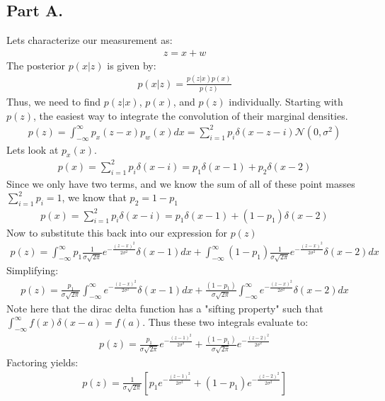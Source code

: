 \documentclass{article}
\begin{document}
\subsection*{Part A.}
Lets characterize our measurement as:
\begin{align*}
z = x + w
\end{align*}
The posterior $p(x|z)$ is given by:
\begin{align*}
p(x|z) = \frac{p(z|x) p(x)}{p(z)}
\end{align*}
Thus, we need to find $p(z|x)$, $p(x)$, and $p(z)$ individually. Starting with $p(z)$, the easiest way to integrate the convolution of their marginal densities.
\begin{align*}
p(z) = \int_{-\infty}^{\infty} p_x(z-x)p_w(x)dx = \sum_{i=1}^{2} p_i \delta(x-z-i) \mathcal{N}(0,\sigma^2)
\end{align*}
Lets look at $p_x(x)$.
\begin{align*}
p(x) = \sum_{i=1}^{2} p_i \delta(x-i) = p_1 \delta(x-1) + p_2 \delta(x-2)
\end{align*}
Since we only have two terms, and we know the sum of all of these point masses $\sum_{i=1}^{2}p_i=1$, we know that $p_2 = 1-p_1$
\begin{align*}
p(x) = \sum_{i=1}^{2} p_i \delta(x-i) = p_1 \delta(x-1) + (1-p_1) \delta(x-2)
\end{align*}
Now to substitute this back into our expression for $p(z)$
\begin{align*}
p(z) = \int_{-\infty}^{\infty} p_1 \frac{1}{\sigma \sqrt{2\pi}} e^{-\tfrac{(z-x)^2}{2\sigma^2}} \delta(x-1) dx + \int_{-\infty}^{\infty} (1-p_1) \frac{1}{\sigma \sqrt{2\pi}} e^{-\tfrac{(z-x)^2}{2\sigma^2}} \delta(x-2) dx
\end{align*}
Simplifying:
\begin{align*}
p(z) = \frac{p_1}{\sigma \sqrt{2\pi}} \int_{-\infty}^{\infty} e^{-\tfrac{(z-x)^2}{2\sigma^2}} \delta(x-1) dx + \frac{(1-p_1)}{\sigma \sqrt{2\pi}} \int_{-\infty}^{\infty} e^{-\tfrac{(z-x)^2}{2\sigma^2}} \delta(x-2) dx
\end{align*}
Note here that the dirac delta function has a "sifting property" such that $\int_{-\infty}^{\infty}f(x)\delta(x-a)=f(a)$. Thus these two integrals evaluate to:
\begin{align*}
p(z) = \frac{p_1}{\sigma \sqrt{2\pi}} e^{-\tfrac{(z-1)^2}{2\sigma^2}} + \frac{(1-p_1)}{\sigma \sqrt{2\pi}} e^{-\tfrac{(z-2)^2}{2\sigma^2}}
\end{align*}
Factoring yields:
\begin{align*}
p(z) = \frac{1}{\sigma \sqrt{2\pi}} [p_1 e^{-\tfrac{(z-1)^2}{2\sigma^2}} + (1-p_1) e^{-\tfrac{(z-2)^2}{2\sigma^2}}]
\end{align*}
\end{document}
